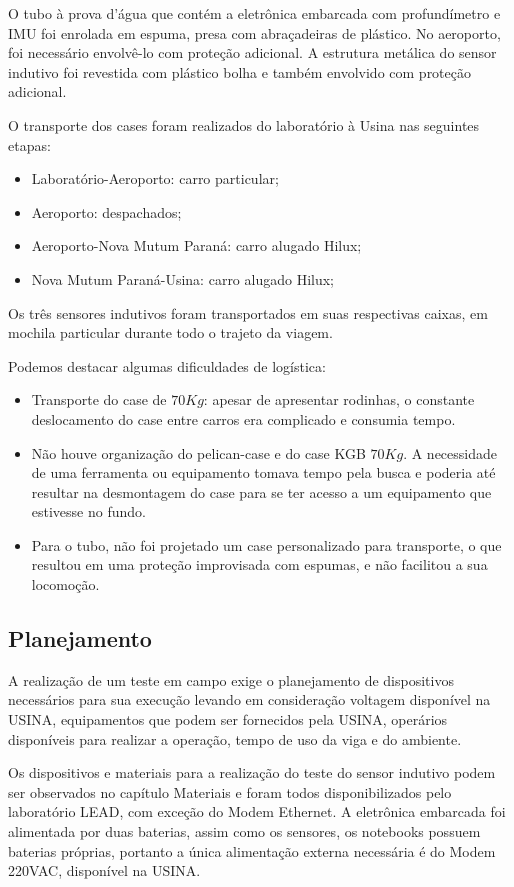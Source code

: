 O tubo à prova d'água que contém a eletrônica embarcada com profundímetro e
IMU foi enrolada em espuma, presa com abraçadeiras de plástico. No aeroporto,
foi necessário envolvê-lo com proteção adicional. A estrutura metálica do sensor
indutivo foi revestida com plástico bolha e também envolvido com proteção
adicional.

O transporte dos cases foram realizados do laboratório à Usina nas
seguintes etapas:
\begin{itemize}
  \item Laboratório-Aeroporto: carro particular;
  \item Aeroporto: despachados;
  \item Aeroporto-Nova Mutum Paraná: carro alugado Hilux;
  \item Nova Mutum Paraná-Usina: carro alugado Hilux;
\end{itemize} 

Os três sensores indutivos foram transportados em suas respectivas caixas, em
mochila particular durante todo o trajeto da viagem.

Podemos destacar algumas dificuldades de logística:
\begin{itemize}
  \item Transporte do case de $70 Kg$: apesar de apresentar rodinhas, o
  constante deslocamento do case entre carros era complicado e consumia tempo.
  \item Não houve organização do pelican-case e do case KGB $70 Kg$. A
  necessidade de uma ferramenta ou equipamento tomava tempo pela busca e poderia
  até resultar na desmontagem do case para se ter acesso a um equipamento que
  estivesse no fundo.
  \item Para o tubo, não foi projetado um case personalizado para transporte, o
  que resultou em uma proteção improvisada com espumas, e não facilitou a sua locomoção. 
\end{itemize} 
 
\subsection{Planejamento}
A realização de um teste em campo exige o planejamento de dispositivos
necessários para sua execução levando em consideração voltagem disponível na
USINA, equipamentos que podem ser fornecidos pela USINA, operários disponíveis
para realizar a operação, tempo de uso da viga e do ambiente.

Os dispositivos e materiais para a realização do teste do sensor indutivo podem
ser observados no capítulo Materiais e foram todos disponibilizados pelo
laboratório LEAD, com exceção do Modem Ethernet. A eletrônica embarcada foi
alimentada por duas baterias, assim como os sensores, os notebooks possuem
baterias próprias, portanto a única alimentação externa necessária é do Modem
220VAC, disponível na USINA.

